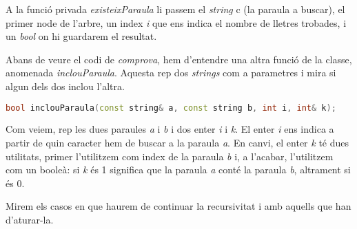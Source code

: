 \documentclass[titlepage]{article}
\begin{document}
A la funció privada \textit{existeixParaula} li passem el \textit{string} c (la paraula a buscar), el primer node de l'arbre, un index \textit{i} que ens indica el nombre de lletres trobades, i un \textit{bool} on hi guardarem el resultat.
\newline\par
Abans de veure el codi de \textit{comprova}, hem d'entendre una altra funció de la classe, anomenada \textit{inclouParaula}. Aquesta rep dos \textit{strings} com a parametres i mira si algun dels dos inclou l'altra. 
\clearpage

\begin{lstlisting}[language=C++]
   bool inclouParaula(const string& a, const string b, int i, int& k);
\end{lstlisting}

Com veiem, rep les dues paraules \textit{a} i \textit{b} i dos enter \textit{i} i \textit{k}. El enter \textit{i} ens indica a partir de quin caracter hem de buscar a la paraula \textit{a}. En canvi, el enter \textit{k} té dues utilitats, primer l'utilitzem com index de la paraula \textit{b} i, a l'acabar, l'utilitzem com un booleà: si \textit{k} és 1 significa que la paraula \textit{a} conté la paraula \textit{b}, altrament si és 0.
\newline\par
Mirem els casos en que haurem de continuar la recursivitat i amb aquells que han d'aturar-la.
\end{document}
